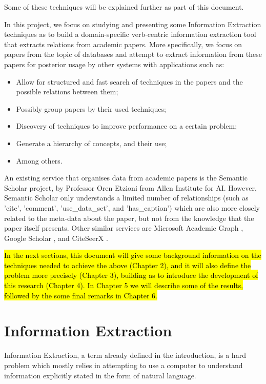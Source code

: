 \documentclass[11pt,a4paper,openright]{memoir}
\begin{document}
Some of these techniques will be explained further as part of this document.

In this project, we focus on studying and presenting some Information Extraction techniques as to build a domain-specific verb-centric information extraction tool that extracts relations from academic papers. More specifically, we focus on papers from the topic of databases and attempt to extract information from these papers for posterior usage by other systems with applications such as:
\begin{itemize}
\item Allow for structured and fast search of techniques in the papers and the possible relations between them;
\item Possibly group papers by their used techniques;
\item Discovery of techniques to improve performance on a certain problem;
\item Generate a hierarchy of concepts, and their use;
\item Among others.
\end{itemize}

An existing service that organises data from academic papers is the Semantic Scholar \cite{semanticscholar} project, by Professor Oren Etzioni from Allen Institute for AI. However, Semantic Scholar only understands a limited number of relationships (such as 'cite', 'comment', 'use\_data\_set', and 'has\_caption') which are also more closely related to the meta-data about the paper, but not from the knowledge that the paper itself presents. Other similar services are Microsoft Academic Graph \cite{microsoft-academic-data}, Google Scholar \cite{google-scholar}, and CiteSeerX \cite{citeseer-x}.

\hl{In the next sections, this document will give some background information on the techniques needed to achieve the above (Chapter 2), and it will also define the problem more precisely (Chapter 3), building as to introduce the development of this research (Chapter 4). In Chapter 5 we will describe some of the results, followed by the some final remarks in Chapter 6.}


%
%
%
%


\chapter{Information Extraction}

Information Extraction, a term already defined in the introduction, is a hard problem which mostly relies in attempting to use a computer to understand information explicitly stated in the form of natural language.
\end{document}
